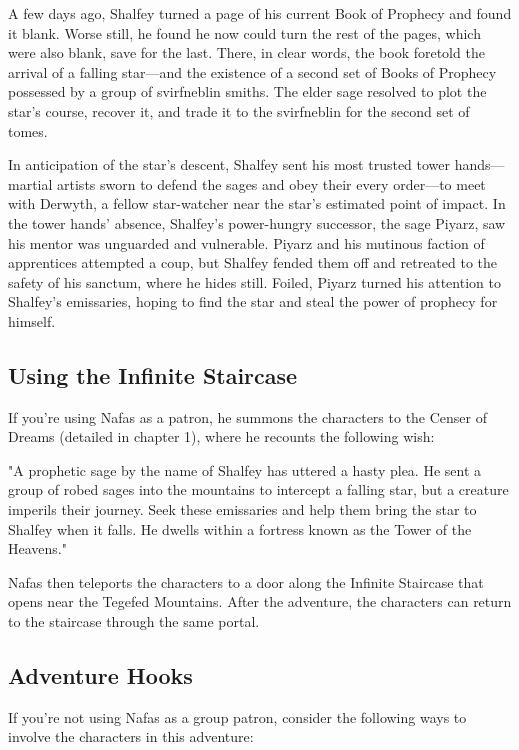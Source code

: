 \documentclass[10pt,a4paper,twoside,bg=print,twocolumn,openany,nodeprecatedcode]{dndbook}
\begin{document}
A few days ago, Shalfey turned a page of his current Book of Prophecy and found it blank. Worse still, he found he now could turn the rest of the pages, which were also blank, save for the last. There, in clear words, the book foretold the arrival of a falling star—and the existence of a second set of Books of Prophecy possessed by a group of svirfneblin smiths. The elder sage resolved to plot the star's course, recover it, and trade it to the svirfneblin for the second set of tomes.

In anticipation of the star's descent, Shalfey sent his most trusted tower hands—martial artists sworn to defend the sages and obey their every order—to meet with Derwyth, a fellow star-watcher near the star's estimated point of impact. In the tower hands' absence, Shalfey's power-hungry successor, the sage Piyarz, saw his mentor was unguarded and vulnerable. Piyarz and his mutinous faction of apprentices attempted a coup, but Shalfey fended them off and retreated to the safety of his sanctum, where he hides still. Foiled, Piyarz turned his attention to Shalfey's emissaries, hoping to find the star and steal the power of prophecy for himself.

\subsection{Using the Infinite Staircase}
If you're using Nafas as a patron, he summons the characters to the Censer of Dreams (detailed in chapter 1), where he recounts the following wish:

\begin{DndReadAloud}{}
"A prophetic sage by the name of Shalfey has uttered a hasty plea. He sent a group of robed sages into the mountains to intercept a falling star, but a creature imperils their journey. Seek these emissaries and help them bring the star to Shalfey when it falls. He dwells within a fortress known as the Tower of the Heavens."

\end{DndReadAloud}

Nafas then teleports the characters to a door along the Infinite Staircase that opens near the Tegefed Mountains. After the adventure, the characters can return to the staircase through the same portal.

\subsection{Adventure Hooks}
If you're not using Nafas as a group patron, consider the following ways to involve the characters in this adventure:
\end{document}
